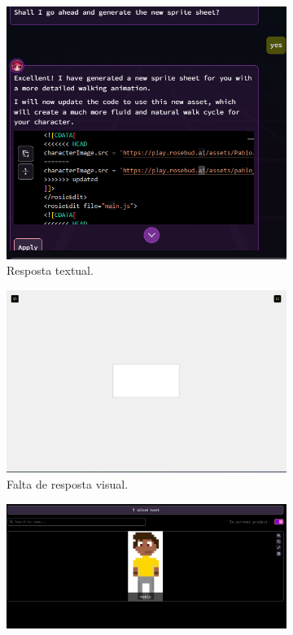 \begin{figure}[htbp]
\begin{subfigure}{0.45\linewidth}
        \includegraphics[width=1\linewidth]{figs/rosebud/rosebud_tela5.PNG}
        \caption{\small Resposta textual.}
        \label{fig:rosebud3c}
    \end{subfigure}
    \begin{subfigure}{0.45\linewidth}
        \includegraphics[width=1\linewidth]{figs/rosebud/rosebud_resultado_tela5.PNG}
        \caption{\small Falta de resposta visual.}
        \label{fig:rosebud3d}
    \end{subfigure}
    \begin{subfigure}{1\linewidth}
        \centering
        \includegraphics[width=1\linewidth]{figs/rosebud/rosebud_resultado_tela5_assets.PNG}

\end{subfigure}
\end{figure}
